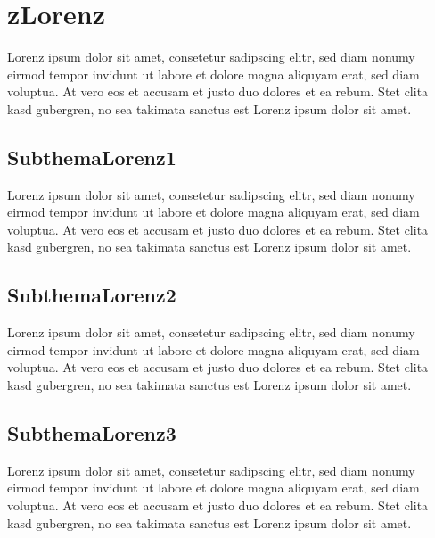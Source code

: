\section{zLorenz}\label{subsec:zLorenz}

Lorenz ipsum dolor sit amet, consetetur sadipscing elitr, sed diam nonumy eirmod tempor invidunt ut labore et dolore magna aliquyam erat, sed diam voluptua.
At vero eos et accusam et justo duo dolores et ea rebum.
Stet clita kasd gubergren, no sea takimata sanctus est Lorenz ipsum dolor sit amet.

\subsection{SubthemaLorenz1}\label{subsubsec:lorenz1}

Lorenz ipsum dolor sit amet, consetetur sadipscing elitr, sed diam nonumy eirmod tempor invidunt ut labore et dolore magna aliquyam erat, sed diam voluptua.
At vero eos et accusam et justo duo dolores et ea rebum.
Stet clita kasd gubergren, no sea takimata sanctus est Lorenz ipsum dolor sit amet.

\subsection{SubthemaLorenz2}\label{subsubsec:lorenz2}

Lorenz ipsum dolor sit amet, consetetur sadipscing elitr, sed diam nonumy eirmod tempor invidunt ut labore et dolore magna aliquyam erat, sed diam voluptua.
At vero eos et accusam et justo duo dolores et ea rebum.
Stet clita kasd gubergren, no sea takimata sanctus est Lorenz ipsum dolor sit amet.

\subsection{SubthemaLorenz3}\label{subsubsec:lorenz3}

Lorenz ipsum dolor sit amet, consetetur sadipscing elitr, sed diam nonumy eirmod tempor invidunt ut labore et dolore magna aliquyam erat, sed diam voluptua.
At vero eos et accusam et justo duo dolores et ea rebum.
Stet clita kasd gubergren, no sea takimata sanctus est Lorenz ipsum dolor sit amet.


